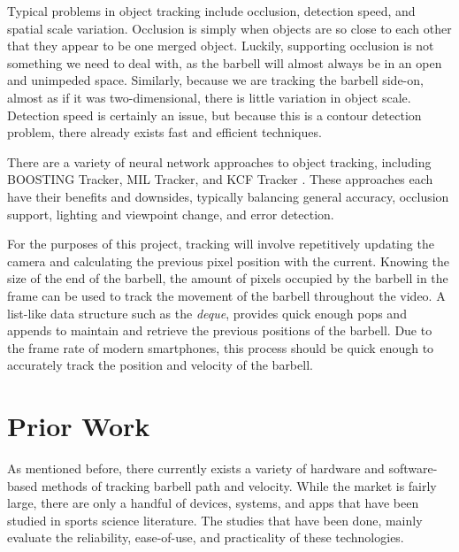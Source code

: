 \documentclass[10pt,twocolumn]{article}
\begin{document}
Typical problems in object tracking include occlusion, detection speed, and spatial scale variation.
Occlusion is simply when objects are so close to each other that they appear to be one merged object.
Luckily, supporting occlusion is not something we need to deal with, as the barbell will almost always be in an open and unimpeded space.
Similarly, because we are tracking the barbell side-on, almost as if it was two-dimensional, there is little variation in object scale.
Detection speed is certainly an issue, but because this is a contour detection problem, there already exists fast and efficient techniques. \par

There are a variety of neural network approaches to object tracking, including BOOSTING Tracker, MIL Tracker, and KCF Tracker \cite{Grabner2006, Babenko2009, Henriques2015}.
These approaches each have their benefits and downsides, typically balancing general accuracy, occlusion support, lighting and viewpoint change, and error detection. \par

For the purposes of this project, tracking will involve repetitively updating the camera and calculating the previous pixel position with the current.
Knowing the size of the end of the barbell, the amount of pixels occupied by the barbell in the frame can be used to track the movement of the barbell throughout the video.
A list-like data structure such as the \emph{deque}, provides quick enough pops and appends to maintain and retrieve the previous positions of the barbell.
Due to the frame rate of modern smartphones, this process should be quick enough to accurately track the position and velocity of the barbell. \par

\section{Prior Work}
As mentioned before, there currently exists a variety of hardware and software-based methods of tracking barbell path and velocity. 
While the market is fairly large, there are only a handful of devices, systems, and apps that have been studied in sports science literature.
The studies that have been done, mainly evaluate the reliability, ease-of-use, and practicality of these technologies. \par
\end{document}
